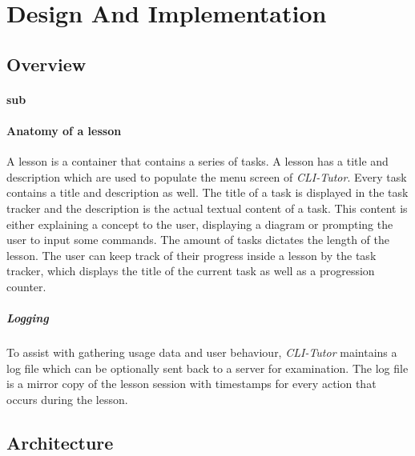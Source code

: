 \chapter{Design And Implementation}
\label{chap:design}
\section{Overview}

\subsubsection{sub}

\subsubsection{Anatomy of a lesson} A lesson is a container that contains a
series of tasks. A lesson has a title and description which are used to
populate the menu screen of \textit{CLI-Tutor}. Every task contains a title and
description as well. The title of a task is displayed in the task tracker and
the description is the actual textual content of a task. This content is either
explaining a concept to the user, displaying a diagram or prompting the user to
input some commands. The amount of tasks dictates the length of the lesson. The
user can keep track of their progress inside a lesson by the task tracker,
which displays the title of the current task as well as a progression counter.

\paragraph{Logging} To assist with gathering usage data and user behaviour,
\textit{CLI-Tutor} maintains a log file which can be optionally sent back to a
server for examination. The log file is a mirror copy of the lesson session
with timestamps for every action that occurs during the lesson.
\section{Architecture}
